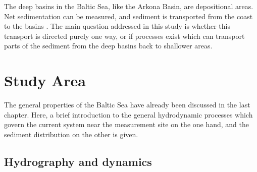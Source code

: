  The deep basins in the Baltic Sea, like the Arkona Basin, are depositional 
areas. Net sedimentation can be measured, and sediment is transported from the 
coast to the basins \citep[][]{basys1, basys2}. The main question addressed in 
this study is whether this transport is directed purely one way, or if processes 
exist which can transport parts of the sediment from the deep basins back to 
shallower areas.

\section{Study Area}

The general properties of the Baltic Sea have already been discussed in the 
last chapter. Here, a brief introduction to the general hydrodynamic 
processes which govern the current system near the measurement site on the one 
hand, and the sediment distribution on the other is given.

\subsection{Hydrography and dynamics} 

